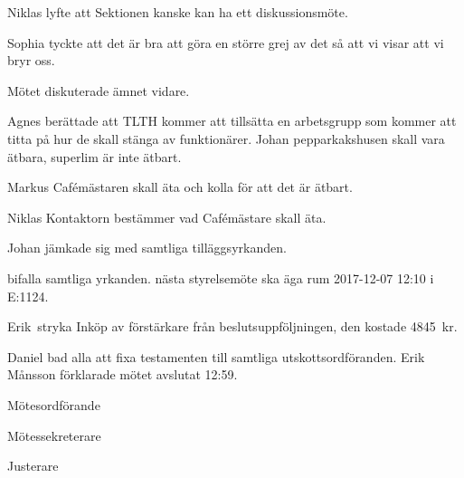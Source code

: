 \documentclass[10pt]{article}
\def\mo{Erik Månsson}
\def\ms{Johan Karlberg}
\def\ji{Markus Rahne}
\begin{document}
\begin{paragrafer}
Niklas lyfte att Sektionen kanske kan ha ett diskussionsmöte.

Sophia tyckte att det är bra att göra en större grej av det så att vi visar att vi bryr oss.

Mötet diskuterade ämnet vidare.

Agnes berättade att TLTH kommer att tillsätta en arbetsgrupp som kommer att titta på hur de skall stänga av funktionärer.
Johan \ypa pepparkakshusen skall vara ätbara, superlim är inte ätbart.

Markus \ypa Cafémästaren skall äta och kolla för att det är ätbart.

Niklas \ypa Kontaktorn bestämmer vad Cafémästare skall äta.

Johan jämkade sig med samtliga tilläggsyrkanden.

\Mba bifalla samtliga yrkanden.
{\Mba} nästa styrelsemöte ska äga rum 2017-12-07 12:10 i E:1124.

Erik \ypa stryka Inköp av förstärkare från beslutsuppföljningen, den kostade \SI{4845}{kr}.

\Mbaby

Daniel bad alla att fixa testamenten till samtliga utskottsordföranden.
{\mo} förklarade mötet avslutat 12:59.

\end{paragrafer}

\newpage
\hidesignfoot
\begin{signatures}{3}
\signature{\mo}{Mötesordförande}
\signature{\ms}{Mötessekreterare}
\signature{\ji}{Justerare}
\end{signatures}
\end{document}
